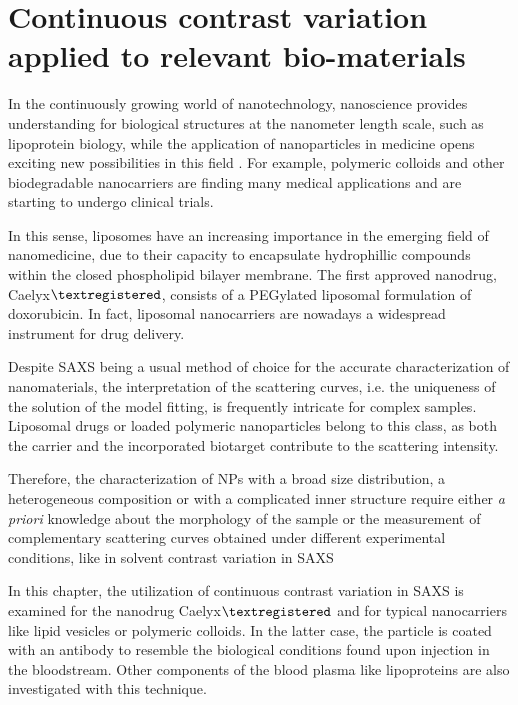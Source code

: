 \chapter{Continuous contrast variation applied to relevant bio-materials}
\label{chap:bio_applications}

In the continuously growing world of nanotechnology, nanoscience provides understanding for biological structures at the nanometer length scale, such as lipoprotein biology, while the application of nanoparticles in medicine opens exciting new possibilities in this field \cite{nie_nanotechnology_2007, sahoo_nanotech_2003, wickline_nanotechnology_2003, zhou_nano-enabled_2014, rosen_rise_2005}. For example, polymeric colloids and other biodegradable nanocarriers are finding many medical applications\citep{vicent_polymer_2006} and are starting to undergo clinical trials\citep{patel_polymeric_2012,beija_colloidal_2012,cabral_progress_2014}. 

In this sense, liposomes have an increasing importance in the emerging field of nanomedicine, due to their capacity to encapsulate hydrophillic compounds within the closed phospholipid bilayer membrane. The first approved nanodrug, Caelyx$\textregistered$, consists of a PEGylated liposomal formulation of doxorubicin. In fact, liposomal nanocarriers are nowadays a widespread instrument for drug delivery.

Despite SAXS being a usual method of choice for the accurate characterization of nanomaterials, the interpretation of the scattering curves, i.e. the uniqueness of the solution of the model fitting, is frequently intricate for complex samples. Liposomal drugs or loaded polymeric nanoparticles belong to this class, as both the carrier and the incorporated biotarget contribute to the scattering intensity. 

Therefore, the characterization of NPs with a broad size distribution, a heterogeneous composition or with a complicated inner structure require either \emph{a priori} knowledge about the morphology of the sample or the measurement of complementary scattering curves obtained under different experimental conditions, like in solvent contrast variation in SAXS 

In this chapter, the utilization of continuous contrast variation in SAXS is examined for the nanodrug Caelyx$\textregistered$ and for typical nanocarriers like lipid vesicles or polymeric colloids. In the latter case, the particle is coated with an antibody to resemble the biological conditions found upon injection in the bloodstream. Other components of the blood plasma like lipoproteins are also investigated with this technique.


